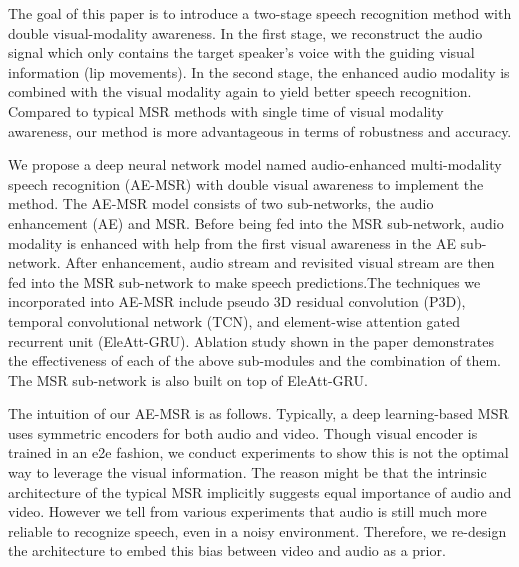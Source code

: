 \documentclass[10pt,twocolumn,letterpaper]{article}
\begin{document}
The goal of this paper is to introduce a two-stage speech recognition method with double visual-modality awareness. In the first stage, we reconstruct the audio signal which only contains the target speaker's voice with the guiding visual information (lip movements). In the second stage, the enhanced audio modality is combined with the visual modality again to yield better speech recognition. Compared to typical MSR methods with single time of visual modality awareness, our method is more advantageous in terms of robustness and accuracy.

We propose a deep neural network model named audio-enhanced multi-modality speech recognition (AE-MSR) with double visual awareness to implement the method. The AE-MSR model consists of two sub-networks, the audio enhancement (AE) and MSR. Before being fed into the MSR sub-network, audio modality is enhanced with help from the first visual awareness in the AE sub-network. After enhancement, audio stream and revisited visual stream are then fed into the MSR sub-network to make speech predictions.The techniques we incorporated into AE-MSR include pseudo 3D residual convolution (P3D), temporal convolutional network (TCN), and element-wise attention gated recurrent unit (EleAtt-GRU). Ablation study shown in the paper demonstrates the effectiveness of each of the above sub-modules and the combination of them. The MSR sub-network is also built on top of EleAtt-GRU. 

The intuition of our AE-MSR is as follows. Typically, a deep learning-based MSR uses symmetric encoders for both audio and video. Though visual encoder is trained in an e2e fashion, we conduct experiments to show this is not the optimal way to leverage the visual information. The reason might be that the intrinsic architecture of the typical MSR implicitly suggests equal importance of audio and video. However we tell from various experiments that audio is still much more reliable to recognize speech, even in a noisy environment. Therefore, we re-design the architecture to embed this bias between video and audio as a prior. 
\\
\end{document}
